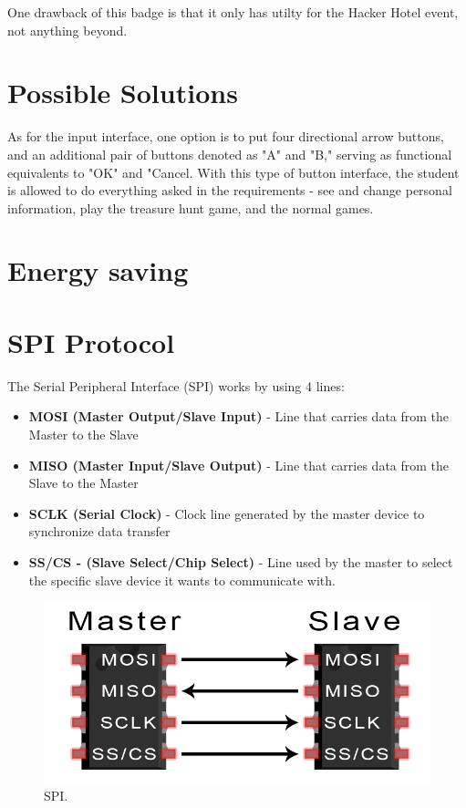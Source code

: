 \documentclass[portuguese]{ist-thesis}
\begin{document}
One drawback of this badge is that it only has utilty for the Hacker Hotel event, not anything beyond.

\section{Possible Solutions}

As for the input interface, one option is to put four directional arrow buttons, and an additional pair of buttons denoted as "A" and "B," serving as functional equivalents to "OK" and "Cancel. With this type of button interface, the student is allowed to do everything asked in the requirements - see and change personal information, play the treasure hunt game, and the normal games. 

\section{Energy saving}



\section{SPI Protocol}

The Serial Peripheral Interface (SPI) works by using 4 lines:

\begin{itemize}
  \item \textbf{MOSI (Master Output/Slave Input)} - Line that carries data from the Master to the Slave
  \item \textbf{MISO (Master Input/Slave Output)} - Line that carries data from the Slave to the Master
  \item \textbf{SCLK (Serial Clock)} - Clock line generated by the master device to synchronize data transfer
  \item \textbf{SS/CS - (Slave Select/Chip Select)} - Line used by the master to select the specific slave device it wants to communicate with.
\end{itemize}

\begin{figure}[ht]
	\centering
	\includegraphics[width = 0.5\linewidth]{images/protocolos/SPI_master_slave.png}
	\caption{SPI.}
	\label{fig:spi}
\end{figure}
\end{document}
